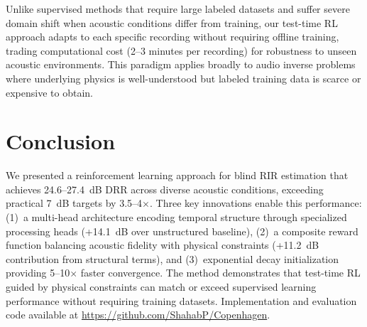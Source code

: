 \documentclass[10pt,conference]{IEEEtran}
\begin{document}
Unlike supervised methods that require large labeled datasets and suffer severe domain shift when acoustic conditions differ from training, our test-time RL approach adapts to each specific recording without requiring offline training, trading computational cost (2--3 minutes per recording) for robustness to unseen acoustic environments. This paradigm applies broadly to audio inverse problems where underlying physics is well-understood but labeled training data is scarce or expensive to obtain.

\section{Conclusion}

We presented a reinforcement learning approach for blind RIR estimation that achieves 24.6--27.4~dB DRR across diverse acoustic conditions, exceeding practical 7~dB targets by 3.5--4$\times$. Three key innovations enable this performance: (1)~a multi-head architecture encoding temporal structure through specialized processing heads (+14.1~dB over unstructured baseline), (2)~a composite reward function balancing acoustic fidelity with physical constraints (+11.2~dB contribution from structural terms), and (3)~exponential decay initialization providing 5--10$\times$ faster convergence. The method demonstrates that test-time RL guided by physical constraints can match or exceed supervised learning performance without requiring training datasets. Implementation and evaluation code available at \url{https://github.com/ShahabP/Copenhagen}.



\end{document}
